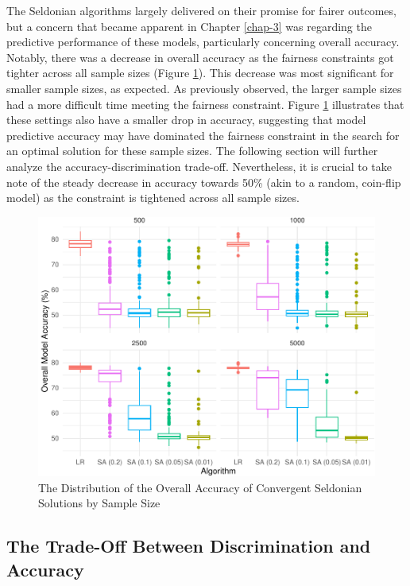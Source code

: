 \documentclass[12pt, twoside]{amherstthesis}
\begin{document}
The Seldonian algorithms largely delivered on their promise for fairer outcomes, but a concern that became apparent in Chapter \ref{chap-3} was regarding the predictive performance of these models, particularly concerning overall accuracy. Notably, there was a decrease in overall accuracy as the fairness constraints got tighter across all sample sizes (Figure \ref{fig:ch4fig3}). This decrease was most significant for smaller sample sizes, as expected. As previously observed, the larger sample sizes had a more difficult time meeting the fairness constraint. Figure \ref{fig:ch4fig3} illustrates that these settings also have a smaller drop in accuracy, suggesting that model predictive accuracy may have dominated the fairness constraint in the search for an optimal solution for these sample sizes. The following section will further analyze the accuracy-discrimination trade-off. Nevertheless, it is crucial to take note of the steady decrease in accuracy towards 50\% (akin to a random, coin-flip model) as the constraint is tightened across all sample sizes.
\begin{figure}

{\centering \includegraphics{Dasha-Asienga_StatThesis_files/figure-latex/ch4fig3-1} 

}

\caption{The Distribution of the Overall Accuracy of Convergent Seldonian Solutions by Sample Size}\label{fig:ch4fig3}
\end{figure}
\hypertarget{the-trade-off-between-discrimination-and-accuracy}{%
\subsection{The Trade-Off Between Discrimination and Accuracy}\label{the-trade-off-between-discrimination-and-accuracy}}
\end{document}
